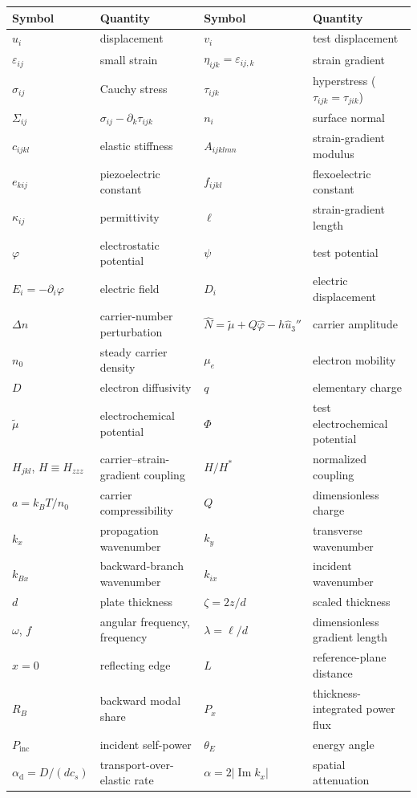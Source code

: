 \documentclass[12pt,a4paper]{article}
\DeclareMathOperator{\Imag}{Im}
\begin{document}
\begin{center}
\small
\begin{tabular}{@{}ll@{\qquad}ll@{}}
\toprule
Symbol & Quantity & Symbol & Quantity \\
\midrule
$u_i$ & displacement & $v_i$ & test displacement \\
$\varepsilon_{ij}$ & small strain & $\eta_{ijk}=\varepsilon_{ij,k}$ & strain gradient \\
$\sigma_{ij}$ & Cauchy stress & $\tau_{ijk}$ & hyperstress ($\tau_{ijk}=\tau_{jik}$) \\
$\Sigma_{ij}$ & $\sigma_{ij}-\partial_k\tau_{ijk}$ & $n_i$ & surface normal \\
$c_{ijkl}$ & elastic stiffness & $A_{ijklmn}$ & strain-gradient modulus \\
$e_{kij}$ & piezoelectric constant & $f_{ijkl}$ & flexoelectric constant \\
$\kappa_{ij}$ & permittivity & $\ell$ & strain-gradient length \\
$\varphi$ & electrostatic potential & $\psi$ & test potential \\
$E_i=-\partial_i\varphi$ & electric field & $D_i$ & electric displacement \\
$\Delta n$ & carrier-number perturbation & $\widehat N=\widetilde\mu+Q\widehat\varphi-h\widehat u_3''$ & carrier amplitude \\
$n_0$ & steady carrier density & $\mu_e$ & electron mobility \\
$D$ & electron diffusivity & $q$ & elementary charge \\
$\widetilde\mu$ & electrochemical potential & $\Phi$ & test electrochemical potential \\
$H_{jkl}$, $H\equiv H_{zzz}$ & carrier--strain-gradient coupling & $H/H^{*}$ & normalized coupling \\
$a=k_BT/n_0$ & carrier compressibility & $Q$ & dimensionless charge \\
$k_x$ & propagation wavenumber & $k_y$ & transverse wavenumber \\
$k_{Bx}$ & backward-branch wavenumber & $k_{ix}$ & incident wavenumber \\
$d$ & plate thickness & $\zeta=2z/d$ & scaled thickness \\
$\omega$, $f$ & angular frequency, frequency & $\lambda=\ell/d$ & dimensionless gradient length \\
$x=0$ & reflecting edge & $L$ & reference-plane distance \\
$R_B$ & backward modal share & $P_x$ & thickness-integrated power flux \\
$P_{\text{inc}}$ & incident self-power & $\theta_E$ & energy angle \\
$\alpha_{\mathrm d}=D/(dc_s)$ & transport-over-elastic rate & $\alpha=2|\Imag k_x|$ & spatial attenuation \\
\bottomrule
\end{tabular}
\end{center}
\end{document}
